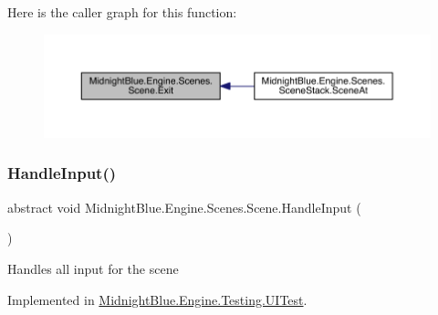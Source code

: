 Here is the caller graph for this function\+:
\nopagebreak
\begin{figure}[H]
\begin{center}
\leavevmode
\includegraphics[width=350pt]{class_midnight_blue_1_1_engine_1_1_scenes_1_1_scene_adbf0f6d758df9fc5e20f24f327599e67_icgraph}
\end{center}
\end{figure}
\hypertarget{class_midnight_blue_1_1_engine_1_1_scenes_1_1_scene_a2f7849ef8976f9aeed0023448033b6fd}{}\label{class_midnight_blue_1_1_engine_1_1_scenes_1_1_scene_a2f7849ef8976f9aeed0023448033b6fd} 
\subsubsection{\texorpdfstring{Handle\+Input()}{HandleInput()}}
{\footnotesize\ttfamily abstract void Midnight\+Blue.\+Engine.\+Scenes.\+Scene.\+Handle\+Input (\begin{DoxyParamCaption}{ }\end{DoxyParamCaption})\hspace{0.3cm}{\ttfamily [pure virtual]}}



Handles all input for the scene 



Implemented in \hyperlink{class_midnight_blue_1_1_engine_1_1_testing_1_1_u_i_test_a6c891f10050ee05fddb5c6d177e80782}{Midnight\+Blue.\+Engine.\+Testing.\+U\+I\+Test}.

\hypertarget{class_midnight_blue_1_1_engine_1_1_scenes_1_1_scene_aa919101862c14384b955d91a4d3362ab}{}\label{class_midnight_blue_1_1_engine_1_1_scenes_1_1_scene_aa919101862c14384b955d91a4d3362ab} 
